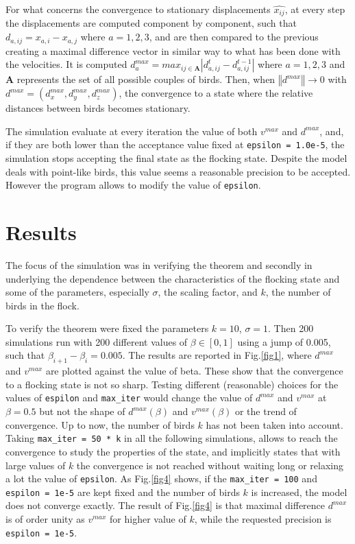 \documentclass{article} %
\newcounter{math}
\begin{document}
For what concerns the convergence to stationary displacements $\widehat{x_{ij}}$, at every 
step the displacements are computed component by component, such that 
$d_{a,ij}=x_{a,i}-x_{a,j}$ where $a=1,2,3$, and are then compared to the previous creating
a maximal difference vector in similar way to what has been done with the velocities.
It is computed $d_a^{max} = max_{ij\in\mathbf{A}}|d_{a,ij}^{t} - d_{a,ij}^{t-1}|$
where $a=1,2,3$ and $\mathbf{A}$ represents the set of all possible couples of birds.
Then, when $\left\Vert d^{max}\right\Vert \rightarrow 0$ with
$d^{max} = (d_x^{max},d_y^{max},d_z^{max})$, the convergence to a state where the relative
distances between birds becomes stationary.

The simulation evaluate at every iteration the value of both $v^{max}$ and $d^{max}$, and, 
if they are both lower than the acceptance value fixed at \verb|epsilon = 1.0e-5|, the simulation stops 
accepting the final state as the flocking state. Despite the model deals with point-like birds, 
this value seems a reasonable precision to be accepted.
However the program allows to modify the value of \verb|epsilon|.

\section {Results}
The focus of the simulation was in verifying the theorem and secondly
in underlying the dependence between the characteristics of the flocking state
and some of the parameters, especially $\sigma$, the scaling factor, and $k$, the number of
birds in the flock.

To verify the theorem were fixed the parameters $k=10$, $\sigma=1$. Then 200 simulations run with 
200 different values of $\beta\in[0,1]$ using a jump of 0.005, such that $\beta_{i+1}-\beta_i=0.005$.
The results are reported in Fig.\ref{fig1}, where $d^{max}$ and $v^{max}$ are plotted against the value
of beta. These show that the convergence to a flocking state is not so sharp. Testing different (reasonable) 
choices for the values of \verb|espilon| and \verb|max_iter| would change the value of $d^{max}$ and $v^{max}$
at $\beta=0.5$ but not the shape of $d^{max}(\beta)$ and $v^{max}(\beta)$  or the trend of convergence.
Up to now, the number of birds $k$ has not been taken into account. Taking \verb|max_iter = 50 * k| in 
all the following simulations, allows to reach the convergence to study the properties of the state, and 
implicitly states that with large values of $k$ the convergence is not reached without waiting long or 
relaxing a lot the value of \verb|epsilon|.
As Fig.\ref{fig4} shows, if the \verb|max_iter = 100| and \verb|espilon = 1e-5| are kept fixed and 
the number of birds $k$ is increased, the model does not converge exactly. The result of Fig.\ref{fig4} is that
maximal difference $d^{max}$ is of order unity as $v^{max}$ for higher value of $k$, while the requested precision
is \verb|espilon = 1e-5|.
\end{document}
